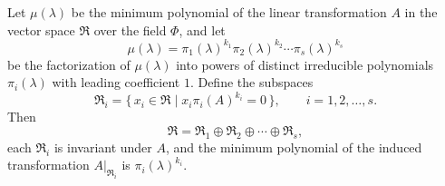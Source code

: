 Let $\mu(\lambda)$ be the minimum polynomial of the linear transformation $A$ in the vector space $\Re$ over the field $\Phi$, and let
$$
\mu(\lambda) = \pi_1(\lambda)^{k_1} \pi_2(\lambda)^{k_2} \cdots \pi_s(\lambda)^{k_s}
$$
be the factorization of $\mu(\lambda)$ into powers of distinct irreducible polynomials $\pi_i(\lambda)$ with leading coefficient $1$. Define the subspaces
$$
\Re_i = \{\, x_i \in \Re \mid x_i \pi_i(A)^{k_i} = 0 \,\}, \qquad i = 1, 2, \dots, s.
$$
Then
$$
\Re = \Re_1 \oplus \Re_2 \oplus \cdots \oplus \Re_s,
$$
each $\Re_i$ is invariant under $A$, and the minimum polynomial of the induced transformation $A|_{\Re_i}$ is $\pi_i(\lambda)^{k_i}$.
